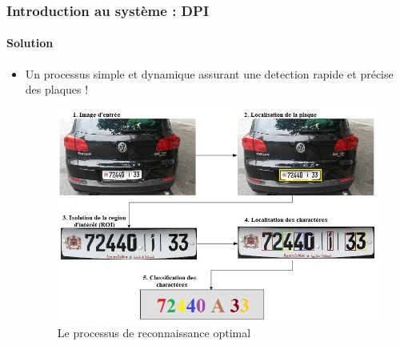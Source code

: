 \begin{frame}
\frametitle{Introduction au système : DPI}
\framesubtitle{Solution}

\begin{itemize}
	\item	<1>	Un processus simple et dynamique assurant une detection rapide et précise des plaques !
	\begin{figure}
	\includegraphics[width=0.7\linewidth]{figures/Process.PNG}\caption{Le processus de reconnaissance optimal}
	\end{figure}
\end{itemize}

\end{frame}

